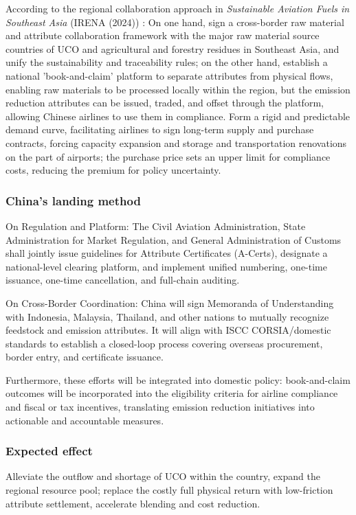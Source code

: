 \documentclass[a4paper,11pt]{article}
\begin{document}
According to the regional collaboration approach in \textit{Sustainable Aviation Fuels in Southeast Asia} (IRENA (2024)) \cite{irena2024}: On one hand, sign a cross-border raw material and attribute collaboration framework with the major raw material source countries of UCO and agricultural and forestry residues in Southeast Asia, and unify the sustainability and traceability rules; on the other hand, establish a national 'book-and-claim' platform to separate attributes from physical flows, enabling raw materials to be processed locally within the region, but the emission reduction attributes can be issued, traded, and offset through the platform, allowing Chinese airlines to use them in compliance. Form a rigid and predictable demand curve, facilitating airlines to sign long-term supply and purchase contracts, forcing capacity expansion and storage and transportation renovations on the part of airports; the purchase price sets an upper limit for compliance costs, reducing the premium for policy uncertainty.

\subsubsection{China's landing method}
On Regulation and Platform: The Civil Aviation Administration, State Administration for Market Regulation, and General Administration of Customs shall jointly issue guidelines for Attribute Certificates (A-Certs), designate a national-level clearing platform, and implement unified numbering, one-time issuance, one-time cancellation, and full-chain auditing.

On Cross-Border Coordination: China will sign Memoranda of Understanding with Indonesia, Malaysia, Thailand, and other nations to mutually recognize feedstock and emission attributes. It will align with ISCC CORSIA/domestic standards to establish a closed-loop process covering overseas procurement, border entry, and certificate issuance.

Furthermore, these efforts will be integrated into domestic policy: book-and-claim outcomes will be incorporated into the eligibility criteria for airline compliance and fiscal or tax incentives, translating emission reduction initiatives into actionable and accountable measures.

\subsubsection{Expected effect}
Alleviate the outflow and shortage of UCO within the country, expand the regional resource pool; replace the costly full physical return with low-friction attribute settlement, accelerate blending and cost reduction.
\end{document}
